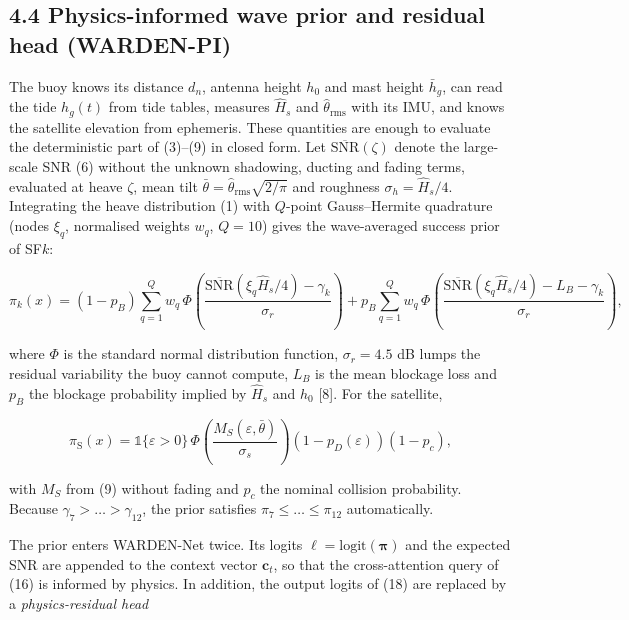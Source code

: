 \documentclass[
  11pt,
]{article}
\begin{document}
\hypertarget{physics-informed-wave-prior-and-residual-head-warden-pi}{%
\subsection{4.4 Physics-informed wave prior and residual head
(WARDEN-PI)}\label{physics-informed-wave-prior-and-residual-head-warden-pi}}

The buoy knows its distance \(d_n\), antenna height \(h_0\) and mast
height \(\bar h_g\), can read the tide \(h_g(t)\) from tide tables,
measures \(\hat H_s\) and \(\hat\theta_{\mathrm{rms}}\) with its IMU,
and knows the satellite elevation from ephemeris. These quantities are
enough to evaluate the deterministic part of (3)--(9) in closed form.
Let \(\overline{\mathrm{SNR}}(\zeta)\) denote the large-scale SNR (6)
without the unknown shadowing, ducting and fading terms, evaluated at
heave \(\zeta\), mean tilt
\(\bar\theta=\hat\theta_{\mathrm{rms}}\sqrt{2/\pi}\) and roughness
\(\sigma_h=\hat H_s/4\). Integrating the heave distribution (1) with
\(Q\)-point Gauss--Hermite quadrature (nodes \(\xi_q\), normalised
weights \(w_q\), \(Q=10\)) gives the wave-averaged success prior of
SF\(k\):

\[\pi_k(x)=(1-p_B)\sum_{q=1}^{Q}w_q\,\Phi\!\left(\frac{\overline{\mathrm{SNR}}(\xi_q\hat H_s/4)-\gamma_k}{\sigma_r}\right)+p_B\sum_{q=1}^{Q}w_q\,\Phi\!\left(\frac{\overline{\mathrm{SNR}}(\xi_q\hat H_s/4)-L_B-\gamma_k}{\sigma_r}\right), \tag{28}\]

where \(\Phi\) is the standard normal distribution function,
\(\sigma_r=4.5\) dB lumps the residual variability the buoy cannot
compute, \(L_B\) is the mean blockage loss and \(p_B\) the blockage
probability implied by \(\hat H_s\) and \(h_0\) {[}8{]}. For the
satellite,

\[\pi_{\mathrm{S}}(x)=\mathbb{1}\{\varepsilon>0\}\,\Phi\!\left(\frac{M_S(\varepsilon,\bar\theta)}{\sigma_s}\right)\left(1-p_D(\varepsilon)\right)\left(1-p_c\right), \tag{29}\]

with \(M_S\) from (9) without fading and \(p_c\) the nominal collision
probability. Because \(\gamma_7>\dots>\gamma_{12}\), the prior satisfies
\(\pi_7\le\dots\le\pi_{12}\) automatically.

The prior enters WARDEN-Net twice. Its logits
\(\boldsymbol{\ell}=\mathrm{logit}(\boldsymbol\pi)\) and the expected
SNR are appended to the context vector \(\mathbf{c}_t\), so that the
cross-attention query of (16) is informed by physics. In addition, the
output logits of (18) are replaced by a \emph{physics-residual head}
\end{document}
